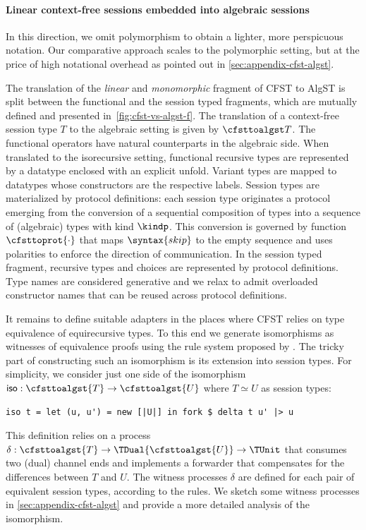 

\paragraph{Linear context-free sessions embedded into algebraic sessions} 
In this direction, we omit polymorphism to obtain a lighter, more
perspicuous notation. Our comparative approach scales to the
polymorphic setting, but at the price of high notational overhead as
pointed out in \cref{sec:appendix-cfst-algst}. 

The translation of the \emph{linear} and \emph{monomorphic} fragment of CFST 
to AlgST is split between the functional and the session typed fragments,
which are mutually defined and presented in~\cref{fig:cfst-vs-algst-f}. The translation of a
context-free session type $T$ to the algebraic setting is given by $\cfsttoalgst T$. 
The functional operators have natural counterparts in the algebraic side.
When translated to the isorecursive setting, functional recursive types are represented 
by a datatype enclosed with an explicit unfold. Variant types are mapped to datatypes whose 
constructors are the respective labels. Session types are materialized by protocol definitions:
each session type originates a protocol emerging from the conversion of a sequential composition of 
types into a sequence of (algebraic) types with kind $\kindp$. 
This conversion is governed by function $\cfsttoprot{\cdot}$ that maps $\syntax{skip}$
to the empty sequence and uses polarities to enforce the direction of communication.
In the session typed fragment, recursive types and choices are represented by protocol definitions.
Type names are considered generative and we relax \algst to admit 
overloaded constructor names that can be reused across protocol definitions.

%

It remains to define suitable adapters in the places where CFST relies
on type equivalence of equirecursive types. To this end we generate
isomorphisms as witnesses of equivalence proofs using the rule system
proposed by \citet{DBLP:journals/corr/abs-2203-12877}. 
The tricky part of constructing such an isomorphism is its extension
into session types. 
For simplicity, we consider just one side of the isomorphism
$\mathsf{iso} : \cfsttoalgst{T} \rightarrow \cfsttoalgst{U}$ 
where $T \simeq U$ as session types:
\begin{lstlisting}
iso t = let (u, u') = new [|U|] in fork $ delta t u' |> u
\end{lstlisting} %
This definition relies on a process $\delta : \cfsttoalgst{T} \to
\TDual{\cfsttoalgst{U}} \to \TUnit$ that consumes two (dual) channel
ends and implements a forwarder that compensates for the differences
between $T$ and $U$. The witness processes $\delta$ are 
defined for each pair of equivalent session types, according 
to the rules. We sketch some witness 
processes in \cref{sec:appendix-cfst-algst} and provide a more detailed analysis of the isomorphism. 

